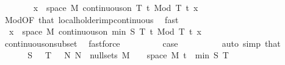 \begin{isabellebody}
\ \ \ \ \ \ \isamarkupfalse%
\ {\isachardoublequoteopen}{\isasymforall}x\ {\isasymin}\ space\ {\isacharquery}{\kern0pt}M{\isachardot}{\kern0pt}\ continuous{\isacharunderscore}{\kern0pt}on\ {\isacharbraceleft}{\kern0pt}{}{\isachardot}{\kern0pt}{\isachardot}{\kern0pt}T{\isacharbraceright}{\kern0pt}\ {\isacharparenleft}{\kern0pt}{\isasymlambda}t{\isachardot}{\kern0pt}\ {\isacharparenleft}{\kern0pt}Mod\ T{\isacharparenright}{\kern0pt}\ t\ x{\isacharparenright}{\kern0pt}{\isachardoublequoteclose}\isanewline
\ \ \ \ \ \ \ \ \isamarkupfalse%
\ Mod{\isacharbrackleft}{\kern0pt}OF\ that{\isacharparenleft}{\kern0pt}{}{\isacharparenright}{\kern0pt}{\isacharbrackright}{\kern0pt}\ local{\isacharunderscore}{\kern0pt}holder{\isacharunderscore}{\kern0pt}imp{\isacharunderscore}{\kern0pt}continuous\ \isamarkupfalse%
\ fast\isanewline
\ \ \ \ \ \ \isamarkupfalse%
\ \isamarkupfalse%
\ {}{\isacharcolon}{\kern0pt}\ {\isachardoublequoteopen}{\isasymforall}x\ {\isasymin}\ space\ {\isacharquery}{\kern0pt}M{\isachardot}{\kern0pt}\ continuous{\isacharunderscore}{\kern0pt}on\ {\isacharbraceleft}{\kern0pt}{}{\isachardot}{\kern0pt}{\isachardot}{\kern0pt}min\ S\ T{\isacharbraceright}{\kern0pt}\ {\isacharparenleft}{\kern0pt}{\isasymlambda}t{\isachardot}{\kern0pt}\ {\isacharparenleft}{\kern0pt}Mod\ T{\isacharparenright}{\kern0pt}\ t\ x{\isacharparenright}{\kern0pt}{\isachardoublequoteclose}\isanewline
\ \ \ \ \ \ \ \ \isamarkupfalse%
\ continuous{\isacharunderscore}{\kern0pt}on{\isacharunderscore}{\kern0pt}subset\ \isamarkupfalse%
\ fastforce\isanewline
\ \ \ \ \ \ \isamarkupfalse%
\ \isamarkupfalse%
\ {\isacharquery}{\kern0pt}case\isanewline
\ \ \ \ \ \ \ \ \isamarkupfalse%
\ {\isacharparenleft}{\kern0pt}auto\ simp{\isacharcolon}{\kern0pt}\ that{\isacharparenleft}{\kern0pt}{}{\isacharparenright}{\kern0pt}{\isacharparenright}{\kern0pt}\isanewline
\ \ \ \ \isamarkupfalse%
\isanewline
\ \ \isamarkupfalse%
\isanewline
\ \ \isamarkupfalse%
\ {\isachardoublequoteopen}{\isasymforall}S\ {\isachargreater}{\kern0pt}\ {}{\isachardot}{\kern0pt}\ {\isasymforall}T\ {\isachargreater}{\kern0pt}\ {}{\isachardot}{\kern0pt}\ {\isasymexists}N{\isachardot}{\kern0pt}\ N\ {\isasymin}\ null{\isacharunderscore}{\kern0pt}sets\ {\isacharquery}{\kern0pt}M\ {\isasymand}\ {\isacharbraceleft}{\kern0pt}{\isasymomega}\ {\isasymin}\ space\ {\isacharquery}{\kern0pt}M{\isachardot}{\kern0pt}\ {\isasymexists}t\ {\isasymin}\ {\isacharbraceleft}{\kern0pt}{}{\isachardot}{\kern0pt}{\isachardot}{\kern0pt}min\ S\ T{\isacharbraceright}{\kern0pt}{\isachardot}{\kern0pt}\isanewline

\end{isabellebody}
